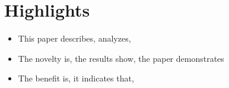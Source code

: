 \documentclass[a4paper,5p,review]{elsarticle}
\begin{document}


\section*{\textbf{Highlights}}

\begin{itemize}
    \item This paper describes, analyzes, 
    \item The novelty is, the results show, the paper demonstrates
    \item The benefit is, it indicates that, 
\end{itemize}

















\end{document}
